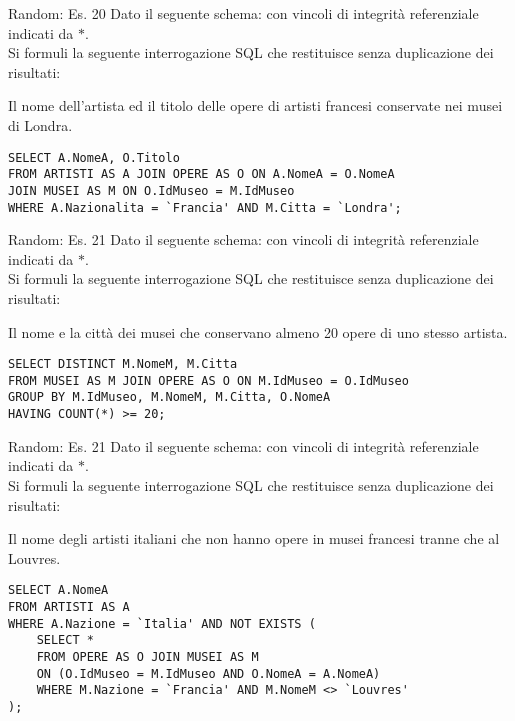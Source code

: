 %
\begin{frame}[fragile]{Random: Es. 20}
\vspace{-.5cm}
Dato il seguente schema:
\schemaMuseiOpereArtisti
con vincoli di integrit\`a referenziale indicati da $*$.
\newline
\\Si formuli la seguente interrogazione SQL che restituisce senza duplicazione dei risultati:

Il nome dell'artista ed il titolo delle opere di artisti francesi conservate nei musei di Londra.
\pause

\begin{lstlisting}   
SELECT A.NomeA, O.Titolo
FROM ARTISTI AS A JOIN OPERE AS O ON A.NomeA = O.NomeA
JOIN MUSEI AS M ON O.IdMuseo = M.IdMuseo
WHERE A.Nazionalita = `Francia' AND M.Citta = `Londra';
\end{lstlisting}
\end{frame}
%
\begin{frame}[fragile]{Random: Es. 21}
\vspace{-.5cm}
Dato il seguente schema:
\schemaMuseiOpereArtisti
con vincoli di integrit\`a referenziale indicati da $*$.
\newline
\\Si formuli la seguente interrogazione SQL che restituisce senza duplicazione dei risultati:

Il nome e la citt\`a dei musei che conservano almeno 20 opere di uno stesso artista.
\pause

\begin{lstlisting}   
SELECT DISTINCT M.NomeM, M.Citta
FROM MUSEI AS M JOIN OPERE AS O ON M.IdMuseo = O.IdMuseo
GROUP BY M.IdMuseo, M.NomeM, M.Citta, O.NomeA
HAVING COUNT(*) >= 20;
\end{lstlisting}
\end{frame}
%
\begin{frame}[fragile]{Random: Es. 21}
\vspace{-.5cm}
Dato il seguente schema:
\schemaMuseiOpereArtisti
con vincoli di integrit\`a referenziale indicati da $*$.
\newline
\\Si formuli la seguente interrogazione SQL che restituisce senza duplicazione dei risultati:

Il nome degli artisti italiani che non hanno opere in musei francesi tranne che al Louvres.
\pause

\begin{lstlisting}   
SELECT A.NomeA
FROM ARTISTI AS A
WHERE A.Nazione = `Italia' AND NOT EXISTS (
    SELECT *
    FROM OPERE AS O JOIN MUSEI AS M
    ON (O.IdMuseo = M.IdMuseo AND O.NomeA = A.NomeA)
    WHERE M.Nazione = `Francia' AND M.NomeM <> `Louvres'
);
\end{lstlisting}
\end{frame}